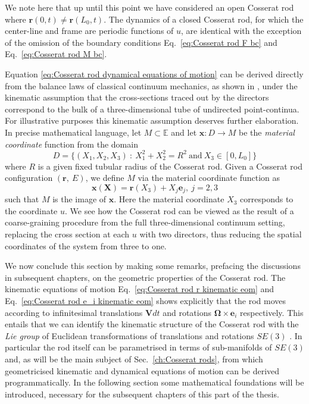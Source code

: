 We note here that up until this point we have considered an open Cosserat rod where $\mathbf{r}(0,t) \neq \mathbf{r}(L_0,t)$. The dynamics of a closed Cosserat rod, for which the center-line and frame are periodic functions of $u$, are identical with the exception of the omission of the boundary conditions Eq.~\ref{eq:Cosserat rod F bc} and Eq.~\ref{eq:Cosserat rod M bc}.

Equation \ref{eq:Cosserat rod dynamical equations of motion} can be derived directly from the balance laws of classical continuum mechanics, as shown in \citep{parkerDerivationNonlinearRod1984, rubinCosseratRods2000}, under the kinematic assumption that the cross-sections traced out by the directors correspond to the bulk of a three-dimensional tube of undirected point-continua. For illustrative purposes this kinematic assumption deserves further elaboration. In precise mathematical language, let $M \subset \mathbb{E}$ and let $\mathbf{x} : D \to M$ be the \textit{material coordinate} function from the domain
\begin{equation}
D = \{ (X_1, X_2, X_3)\ :\ X_1^2 + X_2^2 = R^2\ \text{and}\ X_3 \in [0,L_0]  \}
\end{equation}
where $R$ is a given fixed tubular radius of the Cosserat rod. Given a Cosserat rod configuration $(\mathbf{r},\ E)$, we define $M$ via the material coordinate function as
\begin{equation}
\mathbf{x}(\mathbf{X}) = \mathbf{r}(X_3) + X_j \mathbf{e}_j,\ j=2,3
\end{equation}
such that $M$ is the image of $\mathbf{x}$. Here the material coordinate $X_3$ corresponds to the coordinate $u$. We see how the Cosserat rod can be viewed as the result of a coarse-graining procedure from the full three-dimensional continuum setting, replacing the cross section at each $u$ with two directors, thus reducing the spatial coordinates of the system from three to one.

We now conclude this section by making some remarks, prefacing the discussions in subsequent chapters, on the geometric properties of the Cosserat rod. The kinematic equations of motion Eq.~\ref{eq:Cosserat rod r kinematic eom} and Eq.~\ref{eq:Cosserat rod e_i kinematic eom} shows explicitly that the rod moves according to infinitesimal translations $\mathbf{V}dt$ and rotations $\boldsymbol{\Omega} \times \mathbf{e}_i$ respectively. This entails that we can identify the kinematic structure of the Cosserat rod with the \textit{Lie group} of Euclidean transformations of translations and rotations $SE(3)$ \citep{simoGeometricallyexactRodModel1991, simoThreedimensionalFinitestrainRod1986}. In particular the rod itself can be parametrised in terms of sub-manifolds of $SE(3)$ and, as will be the main subject of Sec.~\ref{ch:Cosserat rods}, from which geometricised kinematic and dynamical equations of motion can be derived programmatically. In the following section some mathematical foundations will be introduced, necessary for the subsequent chapters of this part of the thesis.

